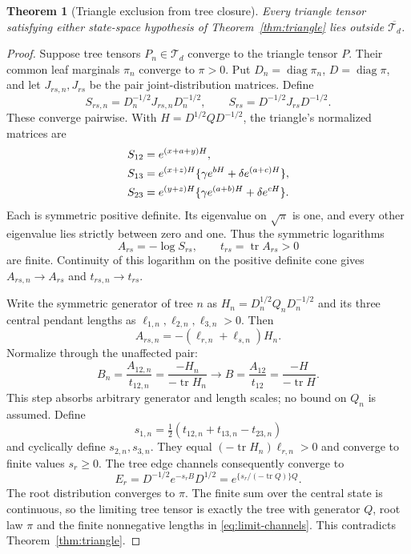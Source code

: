 \documentclass[11pt]{article}
\newtheorem{theorem}{Theorem}[section]
\theoremstyle{definition}
\theoremstyle{remark}
\DeclareMathOperator{\diag}{diag}
\DeclareMathOperator{\tr}{tr}
\begin{document}
\begin{theorem}[Triangle exclusion from tree closure]
\label{thm:triangle-closure}
Every triangle tensor satisfying either state-space hypothesis of
Theorem~\ref{thm:triangle} lies outside $\overline{\mathcal T_d}$.
\end{theorem}
\begin{proof}
Suppose tree tensors $P_n\in\mathcal T_d$ converge to the triangle tensor
$P$. Their common leaf marginals $\pi_n$ converge to $\pi>0$.
Put $D_n=\diag\pi_n$, $D=\diag\pi$, and let $J_{rs,n},J_{rs}$ be
the pair joint-distribution matrices. Define
\[
 S_{rs,n}=D_n^{-1/2}J_{rs,n}D_n^{-1/2},\qquad
 S_{rs}=D^{-1/2}J_{rs}D^{-1/2}.
\]
These converge pairwise. With $H=D^{1/2}QD^{-1/2}$, the triangle's
normalized matrices are
\begin{align}
 S_{12}&=e^{(x+a+y)H},\notag\\
 S_{13}&=e^{(x+z)H}\{\gamma e^{bH}+\delta e^{(a+c)H}\},\label{eq:pair-spd}\\
 S_{23}&=e^{(y+z)H}\{\gamma e^{(a+b)H}+\delta e^{cH}\}.\notag
\end{align}
Each is symmetric positive definite. Its eigenvalue on $\sqrt\pi$ is
one, and every other eigenvalue lies strictly between zero and one.
Thus the symmetric logarithms
\[
 A_{rs}=-\log S_{rs},\qquad t_{rs}=\tr A_{rs}>0
\]
are finite. Continuity of this logarithm on the positive definite cone
gives $A_{rs,n}\to A_{rs}$ and $t_{rs,n}\to t_{rs}$.

Write the symmetric generator of tree $n$ as
$H_n=D_n^{1/2}Q_nD_n^{-1/2}$ and its three central pendant lengths as
$\ell_{1,n},\ell_{2,n},\ell_{3,n}>0$. Then
\[
 A_{rs,n}=-(\ell_{r,n}+\ell_{s,n})H_n.
\]
Normalize through the unaffected pair:
\begin{equation}\label{eq:normalized-generator}
 B_n=\frac{A_{12,n}}{t_{12,n}}
 =\frac{-H_n}{-\tr H_n}
 \longrightarrow B=\frac{A_{12}}{t_{12}}
 =\frac{-H}{-\tr H}.
\end{equation}
This step absorbs arbitrary generator and length scales; no bound on
$Q_n$ is assumed. Define
\[
 s_{1,n}=\tfrac12(t_{12,n}+t_{13,n}-t_{23,n})
\]
and cyclically define $s_{2,n},s_{3,n}$. They equal
$(-\tr H_n)\ell_{r,n}>0$ and converge to finite values $s_r\ge0$.
The tree edge channels consequently converge to
\begin{equation}\label{eq:limit-channels}
 E_r=D^{-1/2}e^{-s_r B}D^{1/2}
     =e^{\{s_r/(-\tr Q)\}Q}.
\end{equation}
The root distribution converges to $\pi$. The finite sum over the central
state is continuous, so the limiting tree tensor is exactly the tree with
generator $Q$, root law $\pi$ and the finite nonnegative lengths in
\eqref{eq:limit-channels}. This contradicts
Theorem~\ref{thm:triangle}.
\end{proof}
\end{document}
